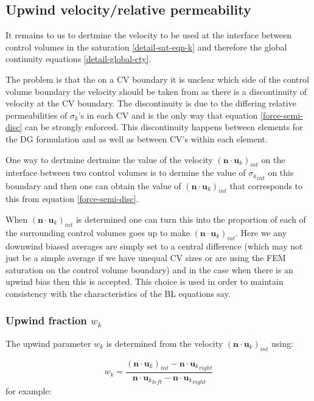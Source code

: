 				

\subsection{Upwind velocity/relative permeability} 
\label{opt-up} 

It remains to us to dertmine the velocity to be used 
at the interface between control volumes in the 
saturation \ref{detail-sat-eqn-k} and therefore 
the global continuity equations \ref{detail-global-cty}. 

The problem is that the on a CV boundary it is unclear 
which side of the control volume boundary the velocity 
should be taken from as there is a discontinuity 
of velocity at the CV boundary. The discontinuity 
is due to the differing relative permeabilities of 
$\sigma_k$'s in each CV and is the only way that 
equation \ref{force-semi-disc} can be strongly enforced. 
This discontinuity happens between elements for the DG 
formulation and as well as between CV's within each element. 

One way to dertmine dertmine the value of the velocity 
$({{\mathbf n}\cdot{\mathbf u}_k})_{int}$ 
on the interface between two control volumes 
is to dermine the value of ${\sigma_k}_{int}$ on this boundary 
and then one can obtain the value of 
$({{\mathbf n}\cdot{\mathbf u}_k})_{int}$ that 
corresponds to this from equation \ref{force-semi-disc}. 

When $({{\mathbf n}\cdot{\mathbf u}_k})_{int}$ 
is determined one can turn this 
into the proportion of each of the surrounding control 
volumes goes up to make 
$({{\mathbf n}\cdot{\mathbf u}_k})_{int}$. Here we any downwind 
biased averages are simply set to a central difference 
(which may not just be a simple average if we have 
unequal CV sizes or are using the FEM saturation 
on the control volume boundary) and in the case 
when there is an upwind bias then this is accepted. 
This choice is used in order to maintain consistency 
with the characteristics of the BL equations say. 

\subsubsection{Upwind fraction $w_k$} 
The upwind parameter $w_k$ is 
determined from the velocity 
$({{\mathbf n}\cdot{\mathbf u}_k})_{int}$ using:

\begin{equation}
w_k= \frac{({{\mathbf n}\cdot{\mathbf u}_k})_{int} - {{\mathbf n}\cdot{\mathbf u}_k}_{right}}{{{\mathbf n}\cdot{\mathbf u}_k}_{left} - {{\mathbf n}\cdot{\mathbf u}_k}_{right}}
\label{w_k} 
\end{equation}
for example:

